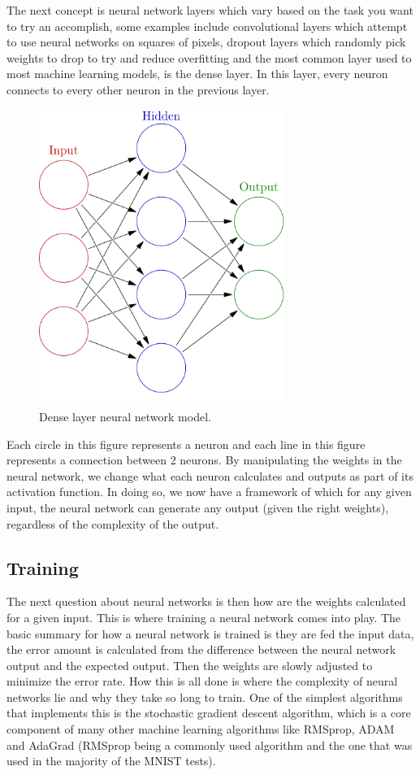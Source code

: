 \documentclass[a4paper,oneside,phd,etd]{BYUPhys}
\begin{document}
The next concept is neural network layers which vary based on the task you want to try an accomplish, some examples include convolutional layers which attempt to use neural networks on squares of pixels, dropout layers which randomly pick weights to drop to try and reduce overfitting and the most common layer used to most machine learning models, is the dense layer. In this layer, every neuron connects to every other neuron in the previous layer.
\begin{figure}[H]
\centering
\includegraphics[width=8cm]{pictures/neural_network_model.png}
\caption{Dense layer neural network model\cite{fig:neural_network_model}.}
\label{fig:neural_network_model}
\end{figure}

Each circle in this figure represents a neuron and each line in this figure represents a connection between 2 neurons. By manipulating the weights in the neural network, we change what each neuron calculates and outputs as part of its activation function. In doing so, we now have a framework of which for any given input, the neural network can generate any output (given the right weights), regardless of the complexity of the output\cite{nielsen}. 

\subsection{Training}
The next question about neural networks is then how are the weights calculated for a given input. This is where training a neural network comes into play. The basic summary for how a neural network is trained is they are fed the input data, the error amount is calculated from the difference between the neural network output and the expected output. Then the weights are slowly adjusted to minimize the error rate. How this is all done is where the complexity of neural networks lie and why they take so long to train. One of the simplest algorithms that implements this is the stochastic gradient descent algorithm, which is a core component of many other machine learning algorithms like RMSprop, ADAM and AdaGrad (RMSprop being a commonly used algorithm and the one that was used in the majority of the MNIST tests). 
\end{document}
